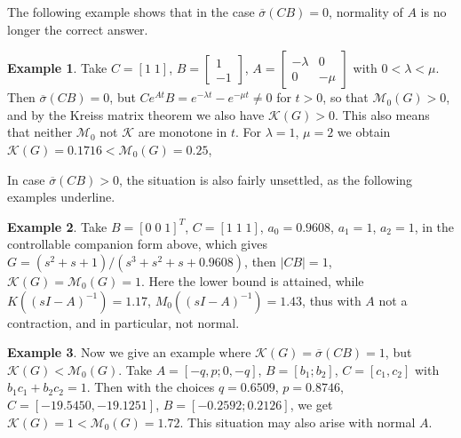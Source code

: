 \documentclass[12pt, a4paper,reqno]{amsart}
\theoremstyle{definition}
\newtheorem{example}{Example}{\rm}
\begin{document}
The following example shows that in the case $\overline{\sigma}(CB)=0$,
normality of $A$ is no longer the correct answer. 

\begin{example} %
\label{example3}
Take $C = [1 \; 1]$, $B = \begin{bmatrix} 1\\-1\end{bmatrix}$, $A = \begin{bmatrix} -\lambda & 0 \\ 0 & -\mu\end{bmatrix}$ with $0< \lambda < \mu$. Then
$\overline{\sigma} (CB)=0$, but $Ce^{At}B = e^{-\lambda t} - e^{-\mu t}  \not=0$ for $t > 0$, so that $\mathcal M_0(G) > 0$, and by the Kreiss matrix theorem we also have
$\mathcal K(G) > 0$. This also means that neither $\mathcal M_0$ not $\mathcal K$ are monotone in $t$. For $\lambda=1$, $\mu=2$ we obtain $\mathcal K(G) = 0.1716 < \mathcal M_0(G) = 0.25$, 
\end{example}

In case $\overline{\sigma}(CB) > 0$, the situation is also fairly unsettled, as the following examples
underline.

\begin{example}  %
Take $B = [ 0\; 0 \;1]^T$,  $C = [1\; 1 \;1]$,  $a_0 = 0.9608$,  $a_1 = 1$,  $a_2 = 1$, in the controllable companion
form above, which gives
$G = (s^2 + s + 1)/(s^3 + s^2 + s + 0.9608)$, then
$|CB| = 1$,  $\mathcal K(G) = \mathcal M_0(G) = 1$.  Here
the lower bound is attained, while
$K( (sI -A)^{-1} ) = 1.17$,  $M_0( (sI-A)^{-1} ) = 1.43 $,  thus with $A$ not a contraction, and in particular, not normal.
\end{example}






\begin{example}  %
\label{example5}
    Now we give an example where $\mathcal K(G) = \overline{\sigma}(CB) =1$, but $\mathcal K(G) < \mathcal M_0(G)$.
    Take $A = [-q , p;0,-q]$, $B=[b_1;b_2]$, $C=[c_1,c_2]$ with $b_1c_1+b_2c_2=1$. 
    Then with the choices $q = 0.6509$, 
$p = 0.8746$,
$C = [-19.5450, -19.1251]$, 
$B = [-0.2592 ;
     0.2126 ]$, 
     we get $\mathcal K(G)=1 < \mathcal M_0(G)=1.72$.
     This situation may also arise with normal $A$.
\end{example}
\end{document}

